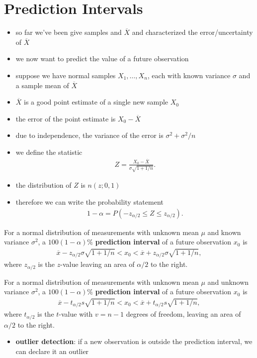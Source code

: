 \documentclass[10pt]{article}
\begin{document}
\section{Prediction Intervals}
\begin{itemize}
    \item so far we've been give samples and $\overline{X}$ and characterized the error/uncertainty of $\overline{X}$ 
    \item we now want to predict the value of a future observation
    \item suppose we have normal samples $X_1, \ldots, X_n$, each with known variance $\sigma$ and a sample mean of $\overline{X}$ 
    \item $\overline{X}$ is a good point estimate of a single new sample $ X_0$
    \item the error of the point estimate is $X_0 - \overline{X}$ 
    \item due to independence, the variance of the error is $\sigma^2 + \sigma^2 / n$
    \item we define the statistic
        \begin{gather*}
            Z = \frac{X_0 - \overline{X}}{\sigma \sqrt{1 + 1 / n} }
        .\end{gather*}
    \item the distribution of $Z$ is $n(z;0,1)$ 
    \item therefore we can write the probability statement
        \begin{gather*}
            1-\alpha = P(-z_{\alpha / 2} \le Z \le z_{\alpha / 2})
        .\end{gather*}
\end{itemize}
\begin{theorem}
    For a normal distribution of measurements with unknown mean $\mu$ and known variance $\sigma^2$, a $100(1-\alpha)\%$ \textbf{prediction interval} of a future observation $x_0$ is
    \begin{gather*}
        \overline{x} - z_{\alpha / 2} \sigma \sqrt{1+1 / n} < x_0 < \overline{x} + z_{\alpha / 2} \sigma \sqrt{1+1 / n}
    ,\end{gather*}
    where $z_{\alpha / 2}$ is the $z$-value leaving an area of $\alpha / 2$ to the right.
\end{theorem}
\begin{theorem}
    For a normal distribution of measurements with unknown mean $\mu$ and unknown variance $\sigma^2$, a $100(1-\alpha)\%$ \textbf{prediction interval} of a future observation $x_0$ is
    \begin{gather*}
        \overline{x} - t_{\alpha / 2} s \sqrt{1+1 / n} < x_0 < \overline{x} + t_{\alpha / 2} s \sqrt{1+1 / n}
    ,\end{gather*}
    where $t_{\alpha / 2}$ is the $t$-value with $v=n-1$ degrees of freedom, leaving an area of $\alpha / 2$ to the right.
\end{theorem}
\begin{itemize}
    \item \textbf{outlier detection}: if a new observation is outside the prediction interval, we can declare it an outlier
\end{itemize}
\end{document}

